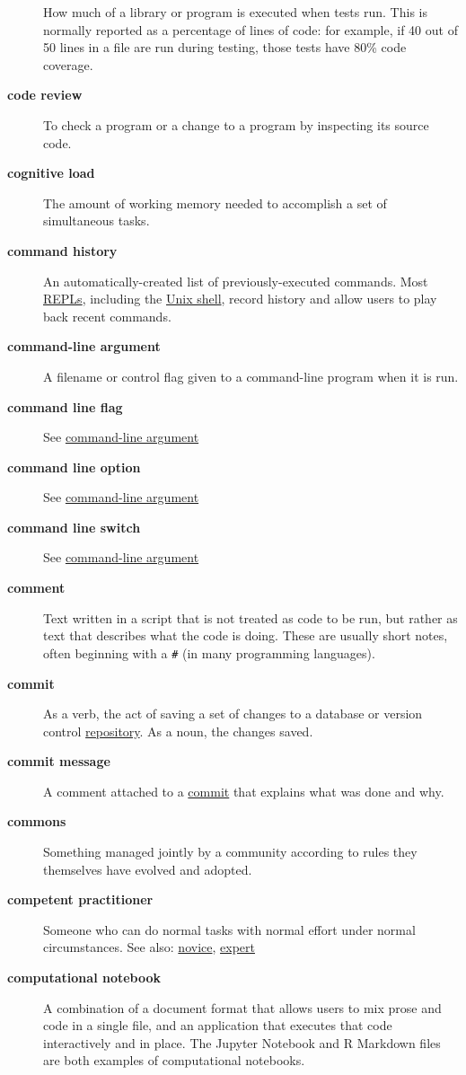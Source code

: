 \documentclass[
]{krantz}
\begin{document}
\begin{description}
How much of a library or program is executed when tests run. This is normally reported as a percentage of lines of code: for example, if 40 out of 50 lines in a file are run during testing, those tests have 80\% code coverage.
\item[\textbf{code review}]
To check a program or a change to a program by inspecting its source code.
\item[\textbf{cognitive load}]
The amount of working memory needed to accomplish a set of simultaneous tasks.
\item[\textbf{command history}]
An automatically-created list of previously-executed commands. Most \protect\hyperlink{repl}{REPLs}, including the \protect\hyperlink{shell}{Unix shell}, record history and allow users to play back recent commands.
\item[\textbf{command-line argument}]
A filename or control flag given to a command-line program when it is run.
\item[\textbf{command line flag}]
See \protect\hyperlink{command_line_argument}{command-line argument}
\item[\textbf{command line option}]
See \protect\hyperlink{command_line_argument}{command-line argument}
\item[\textbf{command line switch}]
See \protect\hyperlink{command_line_argument}{command-line argument}
\item[\textbf{comment}]
Text written in a script that is not treated as code to be run, but rather as text that describes what the code is doing. These are usually short notes, often beginning with a \texttt{\#} (in many programming languages).
\item[\textbf{commit}]
As a verb, the act of saving a set of changes to a database or version control \protect\hyperlink{repository}{repository}. As a noun, the changes saved.
\item[\textbf{commit message}]
A comment attached to a \protect\hyperlink{commit}{commit} that explains what was done and why.
\item[\textbf{commons}]
Something managed jointly by a community according to rules they themselves have evolved and adopted.
\item[\textbf{competent practitioner}]
Someone who can do normal tasks with normal effort under normal circumstances. See also: \protect\hyperlink{novice}{novice}, \protect\hyperlink{expert}{expert}
\item[\textbf{computational notebook}]
A combination of a document format that allows users to mix prose and code in a single file, and an application that executes that code interactively and in place. The Jupyter Notebook and R Markdown files are both examples of computational notebooks.

\end{description}
\end{document}
